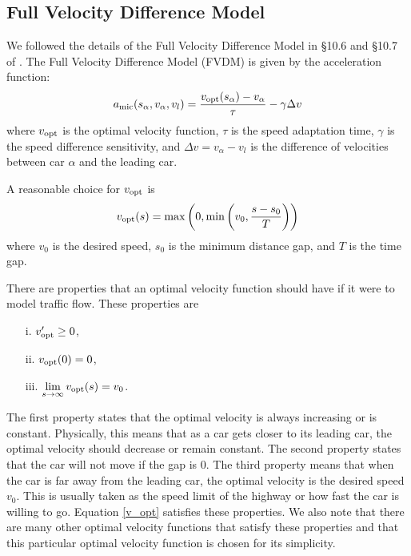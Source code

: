 \documentclass[12pt]{article}
\begin{document}
    \subsection{Full Velocity Difference Model}\label{ch3.1}
    We followed the details of the Full Velocity Difference Model in \S 10.6 and \S 10.7 of \cite{traffic}. The Full Velocity Difference Model (FVDM) is given by the acceleration function: 
    \begin{equation}\label{a_mic}
      a_{\rm mic}(s_\alpha,v_\alpha,v_l) = \frac{v_{\rm opt} (s_\alpha) - v_\alpha}{\tau} - \gamma \Delta v 
    \end{equation}
    where $v_{\rm opt}$ is the optimal velocity function, $\tau$ is the speed adaptation time, $\gamma$ is the speed difference sensitivity, and $\Delta v = v_\alpha - v_l$ is the difference of velocities between car $\alpha$ and the leading car.
    
    A reasonable choice for $v_{\rm opt}$ is 
    \begin{equation}\label{v_opt}
      v_{\rm opt} (s) = \max \left( 0, \min \left( v_0, \frac{s-s_0}{T} \right) \right)
    \end{equation}
    where $v_0$ is the desired speed, $s_0$ is the minimum distance gap, and $T$ is the time gap. 

    There are properties that an optimal velocity function should have if it were to model traffic flow. These properties are
      
    \begin{enumerate}[leftmargin=3\parindent]
      \item[i.] $v_{\rm opt} ' \geq 0$,
      \item[ii.] $v_{\rm opt} (0) = 0$,
      \item[iii.] $\lim\limits_{s \rightarrow \infty} v_{\rm opt} (s) = v_0$. 
    \end{enumerate}
    The first property states that the optimal velocity is always increasing or is constant. Physically, this means that as a car gets closer to its leading car, the optimal velocity should decrease or remain constant. The second property states that the car will not move if the gap is $0$. The third property means that when the car is far away from the leading car, the optimal velocity is the desired speed $v_0$. This is usually taken as the speed limit of the highway or how fast the car is willing to go. Equation \ref{v_opt} satisfies these properties. We also note that there are many other optimal velocity functions that satisfy these properties and that this particular optimal velocity function is chosen for its simplicity.
    
\end{document}
